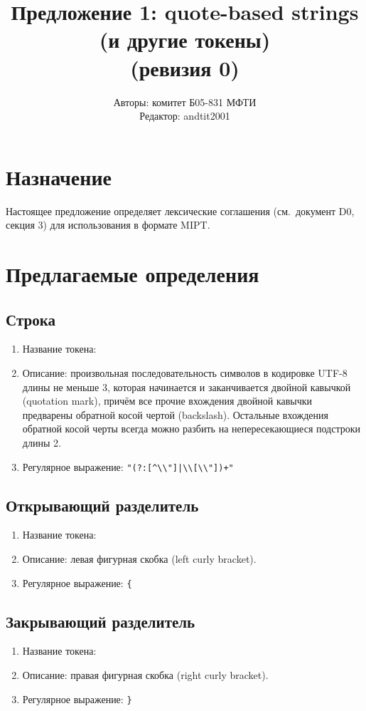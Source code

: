 \documentclass{article}
\title{Предложение 1: quote-based strings (и другие токены) \\ (ревизия 0)}
\author{Авторы: комитет Б05-831 МФТИ \\ Редактор: andtit2001}
\date{\DTMdate{2019-11-07}}
\begin{document}
\maketitle
\tableofcontents
\pagebreak

\section{Назначение}
Настоящее предложение определяет лексические соглашения (см.~документ D0, секция 3) для использования в формате MIPT.

\section{Предлагаемые определения}
\subsection{Строка}
\begin{enumerate}
	\item Название токена: 
	\item Описание: произвольная последовательность символов в кодировке UTF-8 длины не меньше 3, которая начинается и заканчивается двойной кавычкой (quotation mark), причём все прочие вхождения двойной кавычки предварены обратной косой чертой (backslash). Остальные вхождения обратной косой черты всегда можно разбить на непересекающиеся подстроки длины 2.
	\item Регулярное выражение: \verb/"(?:[^\\"]|\\[\\"])+"/
\end{enumerate}

\subsection{Открывающий разделитель}
\begin{enumerate}
	\item Название токена: 
	\item Описание: левая фигурная скобка (left curly bracket).
	\item Регулярное выражение: \verb/{/
\end{enumerate}

\subsection{Закрывающий разделитель}
\begin{enumerate}
	\item Название токена: 
	\item Описание: правая фигурная скобка (right curly bracket).
	\item Регулярное выражение: \verb/}/
\end{enumerate}
\end{document}
